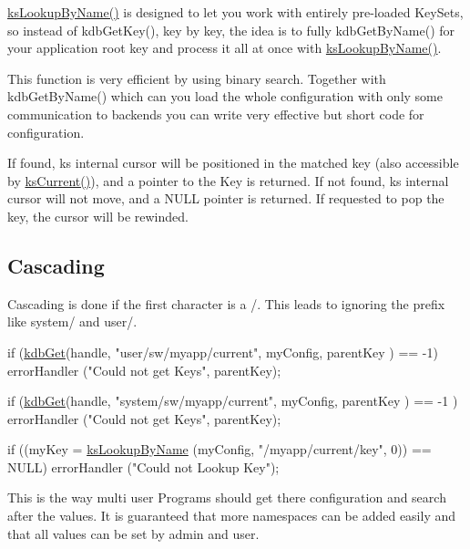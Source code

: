 {\ttfamily \hyperlink{group__keyset_gad2e30fb6d4739d917c5abb2ac2f9c1a1}{ks\-Lookup\-By\-Name()}} is designed to let you work with entirely pre-\/loaded Key\-Sets, so instead of kdb\-Get\-Key(), key by key, the idea is to fully kdb\-Get\-By\-Name() for your application root key and process it all at once with {\ttfamily \hyperlink{group__keyset_gad2e30fb6d4739d917c5abb2ac2f9c1a1}{ks\-Lookup\-By\-Name()}}.

This function is very efficient by using binary search. Together with kdb\-Get\-By\-Name() which can you load the whole configuration with only some communication to backends you can write very effective but short code for configuration.

If found, {\ttfamily ks} internal cursor will be positioned in the matched key (also accessible by \hyperlink{group__keyset_ga4287b9416912c5f2ab9c195cb74fb094}{ks\-Current()}), and a pointer to the Key is returned. If not found, {\ttfamily ks} internal cursor will not move, and a N\-U\-L\-L pointer is returned. If requested to pop the key, the cursor will be rewinded.\hypertarget{group__keyset_cascading}{}\subsection{Cascading}\label{group__keyset_cascading}
Cascading is done if the first character is a /. This leads to ignoring the prefix like system/ and user/. 
\begin{DoxyCode}
\textcolor{keywordflow}{if} (\hyperlink{group__kdb_ga28e385fd9cb7ccfe0b2f1ed2f62453a1}{kdbGet}(handle, \textcolor{stringliteral}{"user/sw/myapp/current"}, myConfig, parentKey ) == -1)
        errorHandler (\textcolor{stringliteral}{"Could not get Keys"}, parentKey);

\textcolor{keywordflow}{if} (\hyperlink{group__kdb_ga28e385fd9cb7ccfe0b2f1ed2f62453a1}{kdbGet}(handle, \textcolor{stringliteral}{"system/sw/myapp/current"}, myConfig, parentKey ) == -1
      )
        errorHandler (\textcolor{stringliteral}{"Could not get Keys"}, parentKey);

\textcolor{keywordflow}{if} ((myKey = \hyperlink{group__keyset_gad2e30fb6d4739d917c5abb2ac2f9c1a1}{ksLookupByName} (myConfig, \textcolor{stringliteral}{"/myapp/current/key"}, 0)) 
      == NULL)
        errorHandler (\textcolor{stringliteral}{"Could not Lookup Key"});
\end{DoxyCode}


This is the way multi user Programs should get there configuration and search after the values. It is guaranteed that more namespaces can be added easily and that all values can be set by admin and user.

